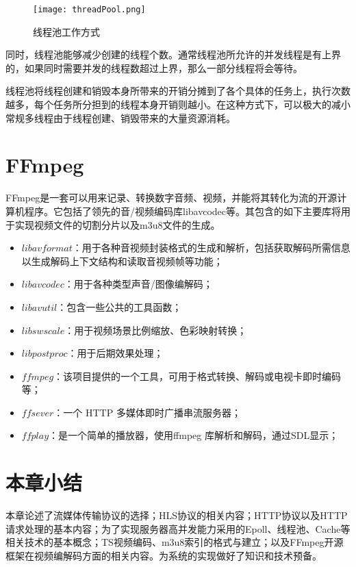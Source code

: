 \documentclass[bachelor]{thesis-uestc}
\begin{document}
\begin{figure}[h]
\texttt{[image: threadPool.png]}
\caption{线程池工作方式}
\label{线程池工作方式} 
\end{figure}

同时，线程池能够减少创建的线程个数。通常线程池所允许的并发线程是有上界的，如果同时需要并发的线程数超过上界，那么一部分线程将会等待。

线程池将线程创建和销毁本身所带来的开销分摊到了各个具体的任务上，执行次数越多，每个任务所分担到的线程本身开销则越小。在这种方式下，可以极大的减小常规多线程由于线程创建、销毁带来的大量资源消耗。


\section{FFmpeg}

FFmpeg是一套可以用来记录、转换数字音频、视频，并能将其转化为流的开源计算机程序。它包括了领先的音/视频编码库libavcodec等。其包含的如下主要库将用于实现视频文件的切割分片以及m3u8文件的生成。

\begin{itemize}
	\item $libavformat$：用于各种音视频封装格式的生成和解析，包括获取解码所需信息以生成解码上下文结构和读取音视频帧等功能；
	\item $libavcodec$：用于各种类型声音/图像编解码；
	\item $libavutil$：包含一些公共的工具函数；
	\item $libswscale$：用于视频场景比例缩放、色彩映射转换；
	\item $libpostproc$：用于后期效果处理；
	\item $ffmpeg$：该项目提供的一个工具，可用于格式转换、解码或电视卡即时编码等；
	\item $ffsever$：一个 HTTP 多媒体即时广播串流服务器；
	\item $ffplay$：是一个简单的播放器，使用ffmpeg 库解析和解码，通过SDL显示；
\end{itemize}


\section{本章小结}

本章论述了流媒体传输协议的选择；HLS协议的相关内容；HTTP协议以及HTTP请求处理的基本内容；为了实现服务器高并发能力采用的Epoll、线程池、Cache等相关技术的基本概念；TS视频编码、m3u8索引的格式与建立；以及FFmpeg开源框架在视频编解码方面的相关内容。为系统的实现做好了知识和技术预备。
\end{document}
